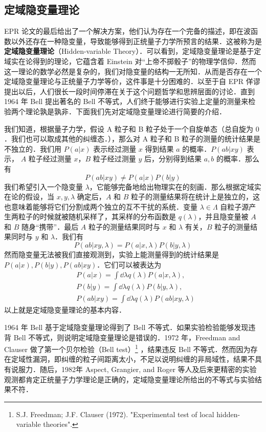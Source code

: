 \subsection{定域隐变量理论}
EPR 论文的最后给出了一个解决方案，他们认为存在一个完备的描述，即在波函数以外还存在一种隐变量，导致能够得到正统量子力学所预言的结果．这被称为是\textbf{定域隐变量理论}（Hidden-variable Theory）．可以看到，定域隐变量理论是基于定域实在论得到的理论，它蕴含着 Einstein 对“上帝不掷骰子”的物理学信仰．然而这一理论的数学必然是复杂的，我们对隐变量的结构一无所知．从而是否存在一个定域隐变量理论与正统量子力学等价，这件事是十分困难的．以至于自 EPR 佯谬提出以后，人们很长一段时间停滞在关于这个问题哲学和思辨层面的讨论．直到 1964 年 Bell 提出著名的 Bell 不等式，人们终于能够进行实验上定量的测量来检验两个理论孰是孰非．下面我们先对定域隐变量理论进行简要的介绍．

我们知道，根据量子力学，假设 A 粒子和 B 粒子处于一个自旋单态（总自旋为 $0$．我们也可以取成其他的纠缠态．），那么对 A 粒子和 B 粒子的测量的统计结果是不独立的．我们用 $P(a | x)$ 表示经过测量 $x$ 得到结果 $a$ 的概率．$P(ab | xy)$ 表示， $A$ 粒子经过测量 $x$，$B$ 粒子经过测量 $y$ 后，分别得到结果 $a,b$ 的概率．那么有
\begin{equation}
P(ab|xy)\neq P(a|x)P(b|y)
\end{equation}
我们希望引入一个隐变量 $\lambda$，它能够完备地给出物理实在的刻画．那么根据定域实在论的假设，当 $x,y,\lambda$ 确定后，$A$ 和 $B$ 粒子的测量结果将在统计上是独立的，这也意味着能够将它们分割成两个独立的互不干扰的系统．变量 $\lambda\in \Lambda$ 自粒子源产生两粒子的时候就被随机采样了，其采样的分布函数是 $q(\lambda)$，并且隐变量被 $A$ 和 $B$ 随身“携带”．最后 $A$ 粒子的测量结果同时与 $x$ 和 $\lambda$ 有关，$B$ 粒子的测量结果同时与 $y$ 和 $\lambda$．我们有
\begin{equation}
P(ab|xy,\lambda)=P(a|x,\lambda)P(b|y,\lambda)
\end{equation}
然而隐变量无法被我们直接观测到，实验上能测量得到的统计结果是 $P(a|x),P(b|y),P(ab|xy)$．它们可以被表达为
\begin{equation}
\begin{aligned}
&P(a|x)=\int \dd \lambda q(\lambda)P(a|x,\lambda),\\
&P(b|y)=\int \dd \lambda q(\lambda)P(b|y,\lambda),\\
&P(ab|xy)=\int \dd \lambda q(\lambda)P(ab|xy,\lambda)
\end{aligned}
\end{equation}
以上就是定域隐变量理论的基本内容．

1964 年 Bell 基于定域隐变量理论得到了 Bell 不等式．如果实验检验能够发现违背 Bell 不等式，则说明定域隐变量理论是错误的．1972 年，Freedman and Clauser 做了第一个贝尔检验（Bell test）\footnote{S.J. Freedman; J.F. Clauser (1972). "Experimental test of local hidden-variable theories".} ，结果违反 Bell 不等式．然而因为存在定域性漏洞，即纠缠的粒子间距离太小，不足以说明纠缠的非局域性，结果不具有说服力．随后，1982年 Aspect, Grangier, and Roger 等人及后来更精密的实验观测都肯定正统量子力学理论是正确的，定域隐变量理论所给出的不等式与实验结果不符．
